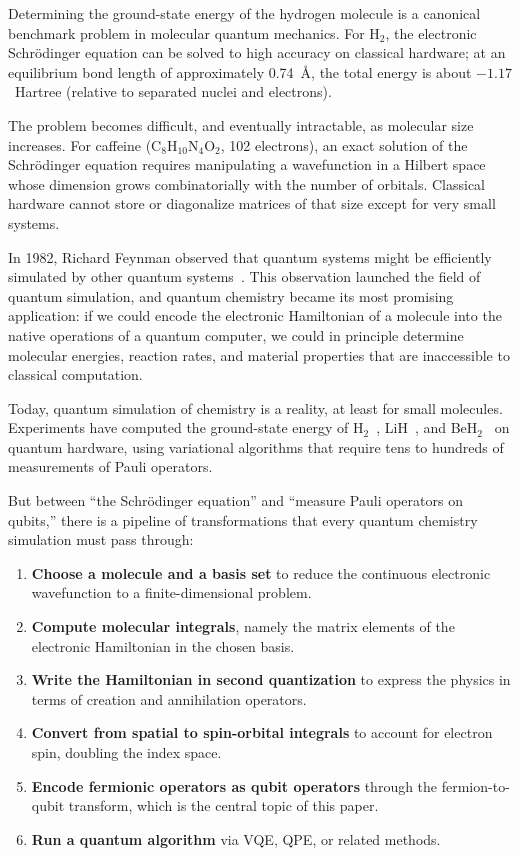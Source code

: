 \documentclass[aps,prb,preprint,longbibliography,nofootinbib]{revtex4-2}
\begin{document}
Determining the ground-state energy of the hydrogen molecule is a
canonical benchmark problem in molecular quantum mechanics.  For H$_2$,
the electronic Schr\"odinger equation can be solved to high accuracy on
classical hardware; at an equilibrium bond length of approximately
0.74~\AA, the total energy is about $-1.17$~Hartree (relative to
separated nuclei and electrons).

The problem becomes difficult, and eventually intractable, as molecular
size increases.  For caffeine (C$_8$H$_{10}$N$_4$O$_2$, 102 electrons),
an exact solution of the Schr\"odinger equation requires manipulating a
wavefunction in a Hilbert space whose dimension grows combinatorially
with the number of orbitals.  Classical hardware cannot store or
diagonalize matrices of that size except for very small systems.

In 1982, Richard Feynman observed that quantum systems might be
efficiently simulated by other quantum systems~\cite{feynman1982}.
This observation launched the field of quantum simulation, and quantum
chemistry became its most promising application: if we could encode the
electronic Hamiltonian of a molecule into the native operations of a
quantum computer, we could in principle determine molecular energies,
reaction rates, and material properties that are inaccessible to
classical computation.

Today, quantum simulation of chemistry is a reality, at least for
small molecules.  Experiments have computed the ground-state energy of
H$_2$~\cite{omalley2016}, LiH~\cite{kandala2017}, and
BeH$_2$~\cite{kandala2019} on quantum hardware, using variational
algorithms that require tens to hundreds of measurements of Pauli
operators.

But between ``the Schr\"odinger equation'' and ``measure Pauli operators
on qubits,'' there is a pipeline of transformations that every quantum
chemistry simulation must pass through:

\begin{enumerate}
  \item \textbf{Choose a molecule and a basis set} to reduce the
    continuous electronic wavefunction to a finite-dimensional problem.
  \item \textbf{Compute molecular integrals}, namely the matrix elements of
    the electronic Hamiltonian in the chosen basis.
  \item \textbf{Write the Hamiltonian in second quantization} to express
    the physics in terms of creation and annihilation operators.
  \item \textbf{Convert from spatial to spin-orbital integrals} to account
    for electron spin, doubling the index space.
  \item \textbf{Encode fermionic operators as qubit operators} through the
    fermion-to-qubit transform, which is the central topic of this paper.
  \item \textbf{Run a quantum algorithm} via VQE, QPE, or related methods.
\end{enumerate}
\end{document}

